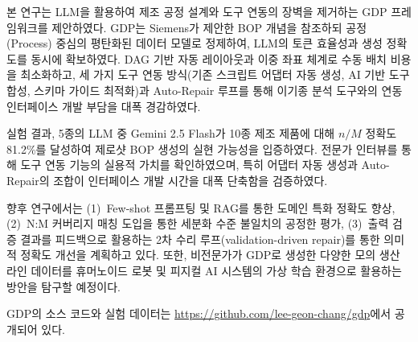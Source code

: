 본 연구는 LLM을 활용하여 제조 공정 설계와 도구 연동의 장벽을 제거하는 GDP 프레임워크를 제안하였다. GDP는 Siemens가 제안한 BOP 개념을 참조하되 공정(Process) 중심의 평탄화된 데이터 모델로 정제하여, LLM의 토큰 효율성과 생성 정확도를 동시에 확보하였다. DAG 기반 자동 레이아웃과 이중 좌표 체계로 수동 배치 비용을 최소화하고, 세 가지 도구 연동 방식(기존 스크립트 어댑터 자동 생성, AI 기반 도구 합성, 스키마 가이드 최적화)과 Auto-Repair 루프를 통해 이기종 분석 도구와의 연동 인터페이스 개발 부담을 대폭 경감하였다.

실험 결과, 5종의 LLM 중 Gemini 2.5 Flash가 10종 제조 제품에 대해 $n/M$ 정확도 81.2\%를 달성하여 제로샷 BOP 생성의 실현 가능성을 입증하였다. 전문가 인터뷰를 통해 도구 연동 기능의 실용적 가치를 확인하였으며, 특히 어댑터 자동 생성과 Auto-Repair의 조합이 인터페이스 개발 시간을 대폭 단축함을 검증하였다.

향후 연구에서는 (1)~Few-shot 프롬프팅 및 RAG를 통한 도메인 특화 정확도 향상, (2)~N:M 커버리지 매칭 도입을 통한 세분화 수준 불일치의 공정한 평가, (3)~출력 검증 결과를 피드백으로 활용하는 2차 수리 루프(validation-driven repair)를 통한 의미적 정확도 개선을 계획하고 있다. 또한, 비전문가가 GDP로 생성한 다양한 모의 생산 라인 데이터를 휴머노이드 로봇 및 피지컬 AI 시스템의 가상 학습 환경으로 활용하는 방안을 탐구할 예정이다.

GDP의 소스 코드와 실험 데이터는 \url{https://github.com/lee-geon-chang/gdp}에서 공개되어 있다.

